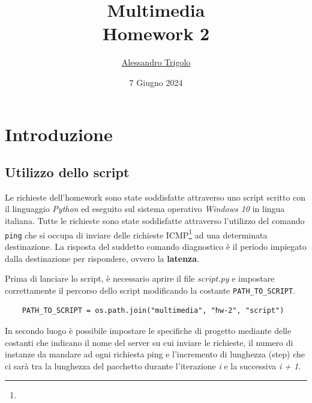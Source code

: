 \title{\vspace{160px} \textbf{\huge{Multimedia}} \\\vspace{17.5px} \LARGE{Homework 2}  \vspace{10px}}
\author{\href{https://github.com/imAlessas}{Alessandro Trigolo}}
\date{7 Giugno 2024}



\maketitle\newpage

\tableofcontents
\vspace{50px}
\listoffigures
\newpage

\listoftodos\newpage

\section{Introduzione}

\vspace{15px}\subsection{Utilizzo dello script}

Le richieste dell'homework sono state soddisfatte attraverso uno script scritto con il linguaggio \textsl{Python} ed eseguito sul sistema operativo \textsl{Windows 10} in lingua italiana. Tutte le richieste sono state soddisfatte attraverso l'utilizzo del comando \texttt{ping} che si occupa di inviare delle richieste ICMP\footnote{} ad una determinata destinazione. La risposta del suddetto comando diagnostico è il periodo impiegato dalla destinazione per rispondere, ovvero la \textbf{latenza}.

Prima di lanciare lo script, è necessario aprire il file \textsl{script.py} e impostare correttamente il percorso dello script modificando la costante \texttt{PATH\_TO\_SCRIPT}.
\begin{lstlisting}
    PATH_TO_SCRIPT = os.path.join("multimedia", "hw-2", "script")
\end{lstlisting}

\noindent In secondo luogo è possibile impostare le specifiche di progetto mediante delle costanti che indicano il nome del server su cui inviare le richieste, il numero di instanze da mandare ad ogni richiesta ping e l'incremento di lunghezza (step) che ci sarà tra la lunghezza del pacchetto durante l'iterazione \textit{i} e la successiva \textit{i + 1}.

